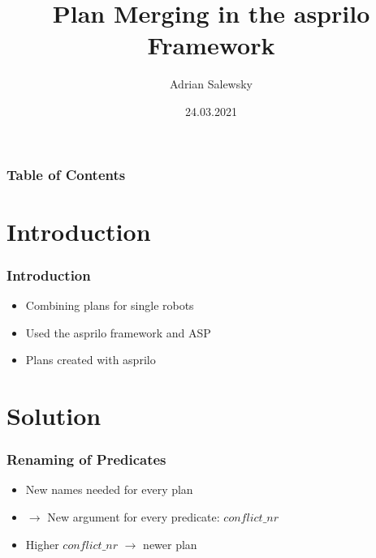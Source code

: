 \documentclass{beamer}
\title{Plan Merging in the asprilo Framework}
\author[Adrian Salewsky]{Adrian Salewsky}
\institute{University of Potsdam}
\date{24.03.2021}
\begin{document}
\frame{\titlepage}

\begin{frame}
\frametitle{Table of Contents}
\tableofcontents
\end{frame}

\section{Introduction} 
\begin{frame}
\frametitle{Introduction}
\begin{itemize}
\item<2-> Combining plans for single robots
\item<3-> Used the asprilo framework and ASP
\item<4-> Plans created with asprilo
\end{itemize}
\end{frame}

\section{Solution}
\begin{frame}
\frametitle{Renaming of Predicates}
\begin{itemize}
\item<2-> New names needed for every plan
\item<3-> $\rightarrow$ New argument for every predicate: $conflict\_nr$ 
\item<4-> Higher $conflict\_nr$ $\rightarrow$ newer plan
\end{itemize}
\end{frame}
\end{document}
